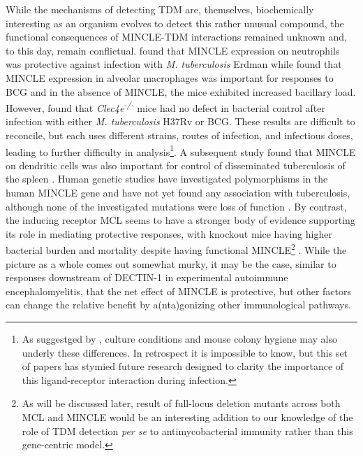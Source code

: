 While the mechanisms of detecting TDM are, themselves, biochemically interesting as an organism evolves to detect this rather unusual compound, the functional consequences of MINCLE\hyp{}TDM interactions remained unknown and, to this day, remain conflictual. \citet{Lee2012} found that MINCLE expression on neutrophils was protective against infection with \textit{M. tuberculosis} Erdman while \citet{Behler2012} found that MINCLE expression in alveolar macrophages was important for responses to BCG and in the absence of MINCLE, the mice exhibited increased bacillary load. However, \citet{Heitmann2013} found that \textit{Clec4e\textsuperscript{\hyp{}/\hyp{}}} mice had no defect in bacterial control after infection with either \textit{M. tuberculosis} H37Rv or BCG. These results are difficult to reconcile, but each uses different strains, routes of infection, and infectious doses, leading to further difficulty in analysis\footnote{As suggestged by \citet{Lang2013}, culture conditions and mouse colony hygiene may also underly these differences. In retrospect it is impossible to know, but this set of papers has stymied future research designed to clarity the importance of this ligand\hyp{}receptor interaction during infection.}. A subsequent study found that MINCLE on dendritic cells was also important for control of disseminated tuberculosis of the spleen \citep{Behler2015}. Human genetic studies have investigated polymorphisms in the human MINCLE gene and have not yet found any association with tuberculosis, although none of the investigated mutations were loss of function \citep{Bowker2016}. By contrast, the inducing receptor MCL seems to have a stronger body of evidence supporting its role in mediating protective responses, with knockout mice having higher bacterial burden and mortality despite having functional MINCLE\footnote{As will be discussed later, result of full-locus deletion mutants across both MCL and MINCLE would be an interesting addition to our knowledge of the role of TDM detection \textit{per se} to antimycobacterial immunity rather than this gene-centric model.} \citep{Wilson2015}. While the picture as a whole comes out somewhat murky, it may be the case, similar to responses downstream of DECTIN\hyp{}1 in experimental autoimmune encephalomyelitis, that the net effect of MINCLE is protective, but other factors can change the relative benefit by a(nta)gonizing other immunological pathways.

